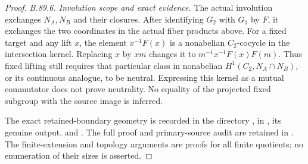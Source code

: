 \begin{proof}
\emph{B.89.6. Involution scope and exact evidence.}
The actual involution exchanges $N_A,N_B$ and their closures. After
identifying $G_2$ with $G_1$ by $F$, it exchanges the two coordinates
in the actual fiber products above. For a fixed target and any lift
$x$, the element $x^{-1}F(x)$ is a nonabelian $C_2$-cocycle in the
intersection kernel. Replacing $x$ by $xm$ changes it to
$m^{-1}x^{-1}F(x)F(m)$. Thus fixed lifting still requires that
particular class in nonabelian $H^1(C_2,N_A\cap N_B)$, or its
continuous analogue, to be neutral. Expressing this kernel as a
mutual commutator does not prove neutrality. No equality of the
projected fixed subgroup with the source image is inferred.

\begingroup\raggedright
The exact retained-boundary geometry is recorded in the directory
, in
, its genuine output, and
.
The full proof and primary-source audit are retained in
.
The finite-extension and topology arguments are proofs for all
finite quotients; no enumeration of their sizes is asserted.\par
\endgroup
\end{proof}
